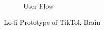 \documentclass{article}
\begin{document}
\begin{figure}[H]
\begin{subfigure}[H]{0.9\textwidth}
        \caption{User Flow}
    \end{subfigure}
    \caption{Lo-fi Prototype of TikTok-Brain}
    \label{fig:prototype}
\end{figure}


\end{document}
